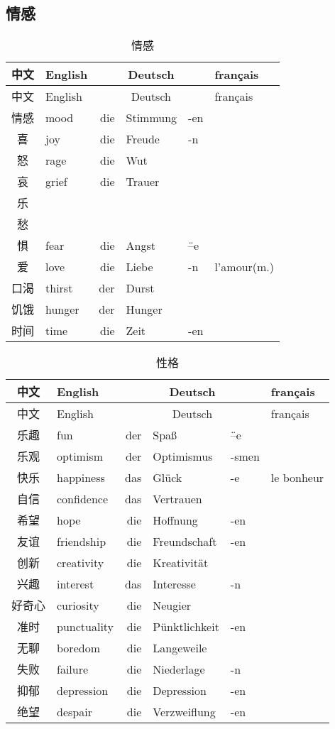 \documentclass[12pt,A4paper,oneside,reqno]{amsart}
\numberwithin{equation}{section}
\theoremstyle{plain}
\theoremstyle{plain}
\theoremstyle{plain}
\numberwithin{equation}{section}
\theoremstyle{remark}
\begin{document}
\subsection{情感}\hspace{1cm}
\begin{longtable}{c|l|rll|l}
	\hline
	中文	&	English	&\multicolumn{3}{c|}{Deutsch} &	français  	\\
	\hline
	\endhead
	\hline
	中文	&	English	&\multicolumn{3}{c|}{Deutsch} &	français  	\\
	\hline
	\endfirsthead	
	\hline
	\endfoot
	\hline	
	\caption{情感}
	\endlastfoot				
情感	&	mood	&	die	&	Stimmung	&	-en	&		\\
喜	&	joy	&	die	&	Freude	&	-n	&		\\
怒	&	rage	&	die	&	Wut	&		&		\\
哀	&	grief	&	die	&	Trauer	&		&		\\
乐	&		&		&		&		&		\\
愁	&		&		&		&		&		\\
惧	&	fear	&	die	&	Angst	&	\"{--}e	&		\\
爱	&	love	&	die	&	Liebe	&	-n	&	l'amour(m.)	\\
口渴	&	thirst	&	der	&	Durst	&		&		\\
饥饿	&	hunger	&	der	&	Hunger	&		&		\\
时间	&	time	&	die	&	Zeit	&	-en	&		\\

	
\end{longtable}
\begin{longtable}{c|l|rll|l}
	\hline
	中文	&	English	&\multicolumn{3}{c|}{Deutsch} &	français  	\\
	\hline
	\endhead
	\hline
	中文	&	English	&\multicolumn{3}{c|}{Deutsch} &	français  	\\
	\hline
	\endfirsthead	
	\hline
	\endfoot
	\hline	
	\caption{性格}
	\endlastfoot				
乐趣	&	fun	&	der	&	Spa\ss	&	\"{--}e	&		\\
乐观	&	optimism	&	der	&	Optimismus	&	-smen	&		\\
快乐	&	happiness	&	das	&	Gl\"{u}ck	&	-e	&	le bonheur	\\
自信	&	confidence	&	das	&	Vertrauen	&		&		\\
希望	&	hope	&	die	&	Hoffnung	&	-en	&		\\
友谊	&	friendship	&	die	&	Freundschaft	&	-en	&		\\
创新	&	creativity	&	die	&	Kreativit\"{a}t	&		&		\\
兴趣	&	interest	&	das	&	Interesse	&	-n	&		\\
好奇心	&	curiosity	&	die	&	Neugier	&		&		\\
准时	&	punctuality	&	die	&	P\"{u}nktlichkeit	&	-en	&		\\
无聊	&	boredom	&	die	&	Langeweile	&		&		\\
失败	&	failure	&	die	&	Niederlage	&	-n	&		\\
抑郁	&	depression	&	die	&	Depression	&	-en	&		\\
绝望	&	despair	&	die	&	Verzweiflung	&	-en	&		\\

	
	
\end{longtable}
\end{document}
